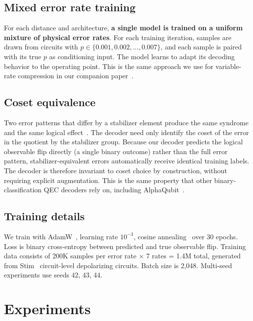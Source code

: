\documentclass[11pt,a4paper]{article}
\begin{document}
\subsection{Mixed error rate training}

For each distance and architecture, \textbf{a single model is
trained on a uniform mixture of physical error rates}. For each training
iteration, samples are drawn from circuits with
$p \in \{0.001, 0.002, \ldots, 0.007\}$, and each sample is paired with
its true $p$ as conditioning input. The model learns to adapt its
decoding behavior to the operating point. This is the same approach we
use for variable-rate compression in our companion
paper~\cite{guarraci2026compression}.

\subsection{Coset equivalence}

Two error patterns that differ by a stabilizer element produce the same
syndrome and the same logical effect~\cite{dennis2002,fowler2012}. The
decoder need only identify the coset of the error in the quotient by the
stabilizer group. Because our decoder predicts the logical observable
flip directly (a single binary outcome) rather than the full error
pattern, stabilizer-equivalent errors automatically receive identical
training labels. The decoder is therefore invariant to coset choice by
construction, without requiring explicit augmentation. This is the same
property that other binary-classification QEC decoders rely on, including
AlphaQubit~\cite{bausch2024alphaqubit}.

\subsection{Training details}

We train with AdamW~\cite{loshchilov2019adamw}, learning rate $10^{-3}$,
cosine annealing~\cite{loshchilov2017sgdr} over 30 epochs. Loss is
binary cross-entropy between predicted and true observable flip. Training
data consists of 200K samples per error rate $\times$ 7 rates = 1.4M
total, generated from Stim~\cite{gidney2021stim} circuit-level
depolarizing circuits. Batch size is 2,048. Multi-seed experiments use
seeds 42, 43, 44.

\section{Experiments}
\end{document}
